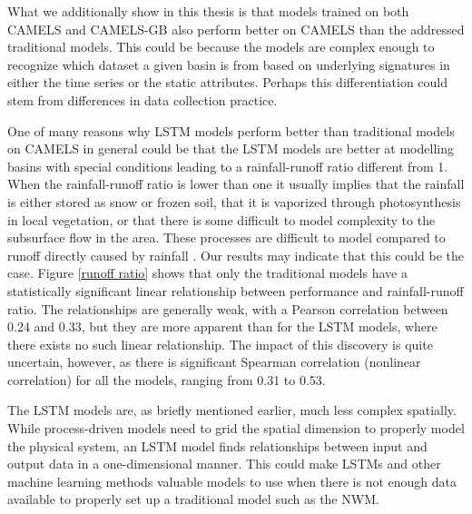 What we additionally show in this thesis is that models trained on both CAMELS and CAMELS-GB 
also perform better on CAMELS than the addressed traditional models. This could 
be because the models are complex enough to recognize which dataset a given 
basin is from based on underlying signatures in either the time series or the 
static attributes. Perhaps this differentiation could stem from differences in 
data collection practice. 

One of many reasons why LSTM models perform better than traditional models on CAMELS in general 
could be that the LSTM 
models are better at modelling basins with special conditions leading to 
a rainfall-runoff ratio different from 1. When the rainfall-runoff ratio is lower 
than one it usually implies that the rainfall is either stored as snow or frozen 
soil, that it is vaporized through photosynthesis in local vegetation, or that there 
is some difficult to model complexity to the subsurface flow in the area. 
These processes are difficult to model compared to runoff directly caused by 
rainfall \citep{process-driven-history}.
Our results may indicate that this could be the case.
Figure \ref{runoff ratio} shows that only the traditional models have 
a statistically significant linear relationship between performance and 
rainfall-runoff ratio. The relationships are generally weak, with a Pearson 
correlation between 0.24 and 0.33, but they are more apparent than 
for the LSTM models, where there exists no such linear relationship. The impact 
of this discovery is quite uncertain, however, as there is significant 
Spearman correlation (nonlinear correlation) for all the models, ranging 
from 0.31 to 0.53.

The LSTM models are, as briefly mentioned earlier, much less complex spatially. 
While process-driven models need to grid the 
spatial dimension to properly model the physical system, an LSTM model finds 
relationships between input and output data in a one-dimensional manner. This could 
make LSTMs and other machine learning methods valuable models to use when there is not 
enough data available to properly set up a traditional model such as the NWM.
